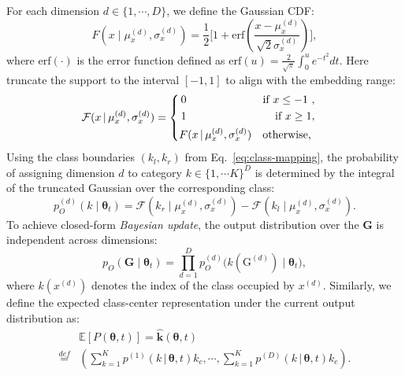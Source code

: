 \documentclass[journal,twoside,web]{ieeecolor}
\begin{document}
For each dimension $d \in \{1,\cdots,D\}$, we define the Gaussian CDF:
\begin{equation}
    F(x \mid \mu_x^{(d)}, \sigma_x^{(d)}) = \frac{1}{2}\Bigg[ 1 + \text{erf} \left( \frac{x-\mu_x^{(d)}}{\sqrt{2}\sigma_x^{(d)}} \right) \Bigg],
\label{eq:gauss-cdf}
\end{equation}
where $\text{erf}(\cdot)$ is the error function defined as $\text{erf}(u)=\frac{2}{\sqrt{\pi}}\int_{0}^{u}e^{-t^2}dt$. Here truncate the support to the interval $[-1, 1]$ to align with the embedding range:
\begin{equation}
    \begin{aligned}
        & \mathcal{F}(x \,|\, \mu_x^{(d)}, \sigma_x^{(d)}) = \left\{
        \begin{aligned}
            & \, 0 & \text{if $ x \leq -1$ },\\
            & \, 1 & \text{if $ x \geq 1 $}, \\
            & F(x \,|\, \mu_x^{(d)}, \sigma_x^{(d)}) & \text{otherwise, }
        \end{aligned}
        \right.
    \end{aligned}
\end{equation}
Using the class boundaries $(k_l, k_r)$ from Eq.~\eqref{eq:class-mapping}, the probability of assigning dimension $d$ to category $k \in \{1, \cdots K\}^D$ is determined by the integral of the truncated Gaussian over the corresponding class:
\begin{equation}
    p_O^{(d)}(k \mid \boldsymbol{\theta}_t) = \mathcal{F}(k_r \mid \mu_x^{(d)}, \sigma_x^{(d)}) - \mathcal{F}(k_l \mid \mu_x^{(d)}, \sigma_x^{(d)}).
\label{eq:po-discrete}
\end{equation}
To achieve closed-form \emph{Bayesian update}, the output distribution over the $\mathbf{G}$ is independent across dimensions:
\begin{equation}
    p_O(\mathbf{G} \mid \boldsymbol{\theta}_t) = \prod_{d=1}^{D}p_O^{(d)}\Big( k(\mathrm{G}^{(d)}) \mid \boldsymbol{\theta}_t \Big),
\label{eq:po-factorised}
\end{equation}
where $k(x^{(d)})$ denotes the index of the class occupied by $x^{(d)}$. Similarly, we define the expected class-center representation under the current output distribution as:
\begin{equation}
    \begin{aligned}
        & \mathbb{E}[P(\boldsymbol{\theta}, t)] = \hat{\mathbf{k}}(\boldsymbol{\theta}, t) \\
        \overset{def}{=} & \left( \sum_{k=1}^{K}p^{(1)}(k \,|\, \boldsymbol{\theta}, t) k_{c}, \cdots, \sum_{k=1}^{K}p^{(D)}(k \,|\, \boldsymbol{\theta}, t) k_{c} \right).
    \end{aligned}
\end{equation}
\end{document}
